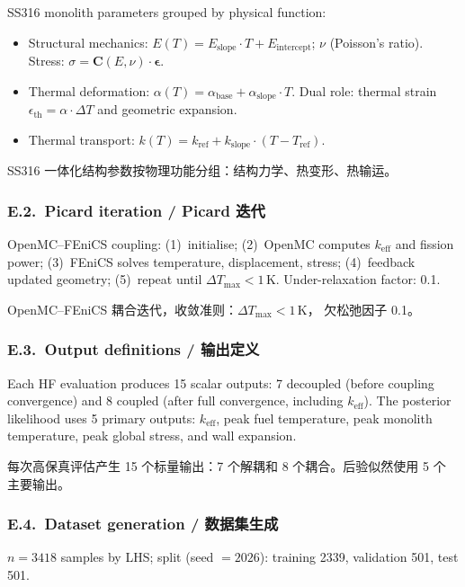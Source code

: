 \documentclass[11pt,a4paper]{article}
\newcommand{\keff}{\ensuremath{k_{\mathrm{eff}}}}
\newcommand{\Eint}{\ensuremath{E_{\mathrm{intercept}}}}
\newcommand{\Eslope}{\ensuremath{E_{\mathrm{slope}}}}
\newcommand{\abase}{\ensuremath{\alpha_{\mathrm{base}}}}
\newcommand{\aslope}{\ensuremath{\alpha_{\mathrm{slope}}}}
\newcommand{\kref}{\ensuremath{k_{\mathrm{ref}}}}
\newcommand{\Tref}{\ensuremath{T_{\mathrm{ref}}}}
\newcommand{\kslope}{\ensuremath{k_{\mathrm{slope}}}}
\begin{document}
SS316 monolith parameters grouped by physical function:
\begin{itemize}
\item Structural mechanics: $E(T) = \Eslope{} \cdot T + \Eint{}$;
  $\nu$ (Poisson's ratio). Stress: $\sigma = \mathbf{C}(E, \nu) \cdot
  \boldsymbol{\epsilon}$.
\item Thermal deformation: $\alpha(T) = \abase{} + \aslope{} \cdot T$.
  Dual role: thermal strain $\epsilon_\mathrm{th} = \alpha \cdot \Delta T$
  and geometric expansion.
\item Thermal transport: $k(T) = \kref{} + \kslope{} \cdot (T - \Tref{})$.
\end{itemize}

SS316 一体化结构参数按物理功能分组：结构力学、热变形、热输运。

\subsubsection*{E.2.~Picard iteration / Picard 迭代}

OpenMC--FEniCS coupling: (1)~initialise; (2)~OpenMC computes \keff{} and
fission power; (3)~FEniCS solves temperature, displacement, stress;
(4)~feedback updated geometry; (5)~repeat until $\Delta T_\mathrm{max}
< 1$\,K. Under-relaxation factor: 0.1.

OpenMC--FEniCS 耦合迭代，收敛准则：$\Delta T_\mathrm{max} < 1$\,K，
欠松弛因子 0.1。

\subsubsection*{E.3.~Output definitions / 输出定义}

Each HF evaluation produces 15 scalar outputs: 7 decoupled (before
coupling convergence) and 8 coupled (after full convergence, including
\keff{}). The posterior likelihood uses 5 primary outputs: \keff{},
peak fuel temperature, peak monolith temperature, peak global stress,
and wall expansion.

每次高保真评估产生 15 个标量输出：7 个解耦和 8 个耦合。后验似然使用 5 个
主要输出。

\subsubsection*{E.4.~Dataset generation / 数据集生成}

$n = 3418$ samples by LHS; split (seed $= 2026$): training 2339,
validation 501, test 501.
\end{document}
